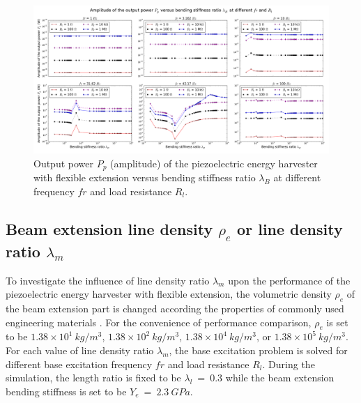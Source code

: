 \documentclass{elsarticle}
\begin{document}
\begin{figure}[!htbp]
    \centering
    \includegraphics[width=\textwidth]{./fig_pow_fr_sl_Rl_sl_vs_lamB}
    \caption{Output power $P_p$ (amplitude) of the piezoelectric energy harvester with flexible extension versus bending stiffness ratio $\lambda_B$ at different frequency $fr$ and load resistance $R_l$. }
    \label{fig:fig_pow_fr_sl_Rl_sl_vs_lamB}
\end{figure}


\subsection{Beam extension line density $\rho_e$ or line density ratio $\lambda_m$}

To investigate the influence of line density ratio $\lambda_m$ upon the performance of the piezoelectric energy harvester with flexible extension, the volumetric density $\rho_e$ of the beam extension part is changed according the properties of commonly used engineering materials \cite{warlimont2018springer}. For the convenience of performance comparison, $\rho_e$ is set to be $1.38\times10^1\ kg/m^3$, $1.38\times10^2\ kg/m^3$, $1.38\times10^4\ kg/m^3$, or $1.38\times10^5\ kg/m^3$. For each value of line density ratio $\lambda_m$, the base excitation problem is solved for different base excitation frequency $fr$ and load resistance $R_l$. During the simulation, the length ratio is fixed to be $\lambda_l\ =\ 0.3$ while the beam extension bending stiffness is set to be $Y_e\ =\ 2.3\ GPa$.
\end{document}
